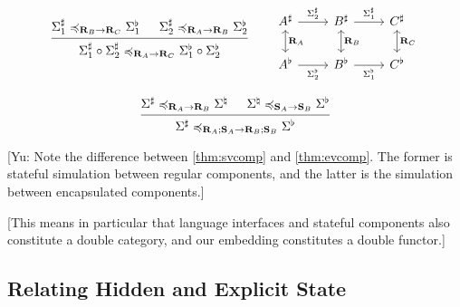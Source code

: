 \documentclass[acmsmall,screen,review,anonymous]{acmart}
\renewcommand{\preceq}{\preccurlyeq}
\begin{document}
\begin{lemma} \label{thm:slcompsim} %
\[
  \begin{prooftree}
    \hypo{
      \Sigma_1^\sharp
      \preceq_{\mathbf{R}_B \rightarrow \mathbf{R}_C}
      \Sigma_1^\flat}
    \hypo{
      \Sigma_2^\sharp
      \preceq_{\mathbf{R}_A \rightarrow \mathbf{R}_B}
      \Sigma_2^\flat}
    \infer2{
      \Sigma_1^\sharp \circ \Sigma_2^\sharp
      \preceq_{\mathbf{R}_A \rightarrow \mathbf{R}_C}
      \Sigma_1^\flat \circ \Sigma_2^\flat}
  \end{prooftree}
  \qquad
  \begin{tikzcd}
    A^\sharp \ar[r, rightarrow, "\Sigma_2^\sharp"]
	     \ar[d, leftrightarrow, "\mathbf{R}_A"] &
    B^\sharp \ar[r, rightarrow, "\Sigma_1^\sharp"]
	     \ar[d, leftrightarrow, "\mathbf{R}_B"] &
    C^\sharp \ar[d, leftrightarrow, "\mathbf{R}_C"]
    \\
    A^\flat \ar[r, rightarrow, "\Sigma_2^\flat"'] &
    B^\flat \ar[r, rightarrow, "\Sigma_1^\flat"'] &
    C^\flat
  \end{tikzcd}
\]
\end{lemma}

\begin{lemma} \label{thm:evcomp} %
\[
  \begin{prooftree}
    \hypo{\Sigma^\sharp
      \preceq_{\mathbf{R}_A \rightarrow \mathbf{R}_B}
      \Sigma^\natural}
    \hypo{\Sigma^\natural
      \preceq_{\mathbf{S}_A \rightarrow \mathbf{S}_B}
      \Sigma^\flat}
    \infer2{\Sigma^\sharp
      \preceq_{\mathbf{R}_A \mathbin; \mathbf{S}_A \rightarrow
	   \mathbf{R}_B \mathbin; \mathbf{S}_B}
      \Sigma^\flat}
  \end{prooftree}
\]
\end{lemma}
[Yu: Note the difference between \ref{thm:svcomp} and \ref{thm:evcomp}.
The former is stateful simulation between regular components,
and the latter is the simulation between encapsulated components.]

[This means in particular that language interfaces and stateful components
also constitute a double category,
and our embedding constitutes a double functor.]


\subsection{Relating Hidden and Explicit State} %
\end{document}
